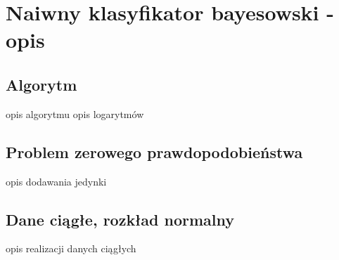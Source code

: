 \chapter{Naiwny klasyfikator bayesowski - opis}
	\section{Algorytm} \label{algo}
opis algorytmu
opis logarytmów
	\section{Problem zerowego prawdopodobieństwa}
opis dodawania jedynki
	\section{Dane ciągłe, rozkład normalny}
opis realizacji danych ciągłych
